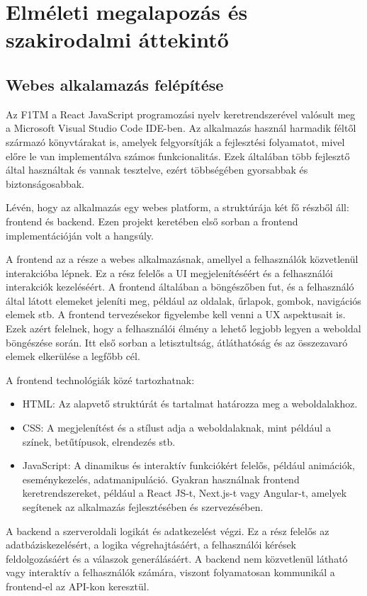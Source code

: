 \section {Elméleti megalapozás és szakirodalmi áttekintő}
\subsection {Webes alkalamazás felépítése}

Az F1TM a React JavaScript programozási nyelv keretrendszerével valósult meg a Microsoft Visual Studio Code IDE-ben. Az alkalmazás használ harmadik féltől származó könyvtárakat is, amelyek felgyorsítják a fejlesztési folyamatot, mivel előre le van implementálva számos funkcionalitás. Ezek általában több fejlesztő által használtak és vannak tesztelve, ezért többségében gyorsabbak és biztonságosabbak.

Lévén, hogy az alkalmazás egy webes platform, a struktúrája két fő részből áll: frontend és backend. Ezen projekt keretében első sorban a frontend implementációján volt a hangsúly.

A frontend az a része a webes alkalmazásnak, amellyel a felhasználók közvetlenül interakcióba lépnek. Ez a rész felelős a UI megjelenítéséért és a felhasználói interakciók kezeléséért. A frontend általában a böngészőben fut, és a felhasználó által látott elemeket jeleníti meg, például az oldalak, űrlapok, gombok, navigációs elemek stb. A frontend tervezésekor figyelembe kell venni a UX aspektusait is. Ezek azért felelnek, hogy a felhasználói élmény a lehető legjobb legyen a weboldal böngészése során. Itt első sorban a letisztultság, átláthatóság és az összezavaró elemek elkerülése a legfőbb cél.

A frontend technológiák közé tartozhatnak:
\begin{itemize}
	\item HTML: Az alapvető struktúrát és tartalmat határozza meg a weboldalakhoz.
	\item CSS: A megjelenítést és a stílust adja a weboldalaknak, mint például a színek, betűtípusok, elrendezés stb.
	\item JavaScript: A dinamikus és interaktív funkciókért felelős, például animációk, eseménykezelés, adatmanipuláció. Gyakran használnak frontend keretrendszereket, például a React JS-t, Next.js-t vagy Angular-t, amelyek segítenek az alkalmazás fejlesztésében és szervezésében. 
\end{itemize}

A backend a szerveroldali logikát és adatkezelést végzi. Ez a rész felelős az adatbáziskezelésért, a logika végrehajtásáért, a felhasználói kérések feldolgozásáért és a válaszok generálásáért. A backend nem közvetlenül látható vagy interaktív a felhasználók számára, viszont folyamatosan kommunikál a frontend-el az API-kon keresztül.

